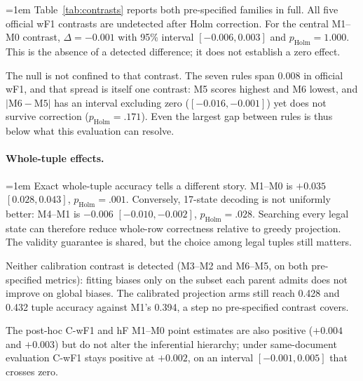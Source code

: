 \begingroup\emergencystretch=1em
Table~\ref{tab:contrasts} reports both pre-specified families in full. All
five official wF1 contrasts are undetected after Holm correction. For the
central M1--M0 contrast, $\Delta=-0.001$ with 95\% interval
$[-0.006,0.003]$ and $p_{\mathrm{Holm}}=1.000$. This is the absence of a
detected difference; it does not establish a zero effect.

The null is not confined to that contrast. The seven rules span $0.008$ in
official wF1, and that spread is itself one contrast: M5 scores highest and M6
lowest, and $|\textrm{M6}-\textrm{M5}|$ has an interval excluding zero
($[-0.016,-0.001]$) yet does not survive correction
($p_{\mathrm{Holm}}=.171$). Even the largest gap between rules is thus below
what this evaluation can resolve.
\par\endgroup

\paragraph{Whole-tuple effects.}
\begingroup\emergencystretch=1em
Exact whole-tuple accuracy tells a different story. M1--M0 is $+0.035$
$[0.028,0.043]$, $p_{\mathrm{Holm}}=.001$. Conversely, 17-state
decoding is not uniformly better: M4--M1 is $-0.006$
$[-0.010,-0.002]$, $p_{\mathrm{Holm}}=.028$. Searching every legal state can
therefore reduce whole-row correctness relative to greedy projection. The
validity guarantee is shared, but the choice among legal tuples still matters.
\par\endgroup

Neither calibration contrast is detected (M3--M2 and M6--M5, on both
pre-specified metrics): fitting biases only on the subset each parent admits
does not improve on global biases. The calibrated projection arms still reach
0.428 and 0.432 tuple accuracy against M1's 0.394, a step no pre-specified
contrast covers.

The post-hoc C-wF1 and hF M1--M0 point estimates are also positive ($+0.004$
and $+0.003$) but do not alter the inferential hierarchy; under same-document
evaluation C-wF1 stays positive at $+0.002$, on an interval $[-0.001,0.005]$
that crosses zero.

\begin{table}[t]
  \centering
  \small
  \caption{Chinese anchor under same-document and document-disjoint
  evaluation; $\Delta$ compares the resulting estimands, with independently
  rounded values.}
  \label{tab:regimes}
  \begingroup
  \small
  \setlength{\tabcolsep}{4pt}
  
  \endgroup
\end{table}


